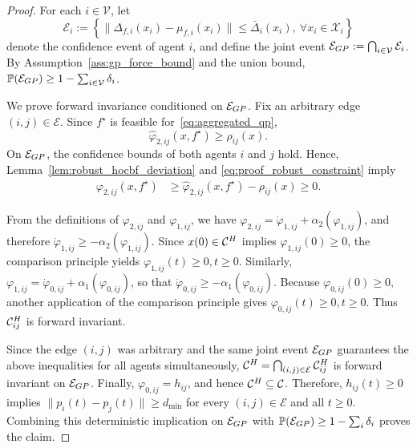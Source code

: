 \documentclass[10pt,a4paper]{amsart}
\begin{document}
\begin{proof}
For each $i\in\mathcal V$, let
\[
    \mathcal E_i
    :=
    \left\{
    \|\Delta_{f,i}(x_i)-\mu_{f,i}(x_i)\|
    \leq \bar\Delta_i(x_i),
    \ \forall x_i\in\mathcal X_i
    \right\}
\]
denote the confidence event of agent $i$, and define the joint
event $\mathcal E_{\rm GP}
    :=
    \bigcap_{i\in\mathcal V}\mathcal E_i$.
By Assumption~\ref{ass:gp_force_bound} and the union bound, $\mathbb P(\mathcal E_{\rm GP})
    \geq
    1-\sum_{i\in\mathcal V}\delta_i$.

We prove forward invariance conditioned on
$\mathcal E_{\rm GP}$. Fix an arbitrary edge
$(i,j)\in\mathcal E$. Since
$f^\star$ is feasible for~\eqref{eq:aggregated_qp},
\begin{equation}
    \widehat\varphi_{2,ij}(x,f^\star)
    \geq
    \rho_{ij}(x).
    \label{eq:proof_robust_constraint}
\end{equation}
On $\mathcal E_{\rm GP}$, the confidence bounds of both
agents $i$ and $j$ hold. Hence,
Lemma~\ref{lem:robust_hocbf_deviation} and
\eqref{eq:proof_robust_constraint} imply
\[
\begin{aligned}
    \varphi_{2,ij}(x,f^\star)
    &\geq
    \widehat\varphi_{2,ij}(x,f^\star)
    -
    \rho_{ij}(x)\geq0 .
\end{aligned}
\]

From the definitions of $\varphi_{2,ij}$ and $\varphi_{1,ij}$, we have 
$\varphi_{2,ij}
    =
    \dot\varphi_{1,ij}
    +
    \alpha_2(\varphi_{1,ij})$, and therefore
$\dot\varphi_{1,ij}
    \geq
    -\alpha_2(\varphi_{1,ij})$. Since $x(0)\in\mathcal C^{\rm H}$ implies
$\varphi_{1,ij}(0)\geq0$, the comparison principle yields $\varphi_{1,ij}(t)\geq0, t\geq0$. Similarly,
$\varphi_{1,ij}
    =
    \dot\varphi_{0,ij}
    +
    \alpha_1(\varphi_{0,ij})$, so that $\dot\varphi_{0,ij}
    \geq
    -\alpha_1(\varphi_{0,ij})$. Because $\varphi_{0,ij}(0)\geq0$, another application of the
comparison principle gives
$\varphi_{0,ij}(t)\geq0, t\geq0$. Thus $\mathcal C_{ij}^{\rm H}$ is forward invariant.

Since the edge $(i,j)$ was arbitrary and the same joint event
$\mathcal E_{\rm GP}$ guarantees the above inequalities for
all agents simultaneously,
$\mathcal C^{\rm H}
    =
    \bigcap_{(i,j)\in\mathcal E}
    \mathcal C_{ij}^{\rm H}$ is forward invariant on $\mathcal E_{\rm GP}$. Finally,
$\varphi_{0,ij}=h_{ij}$, and hence
$\mathcal C^{\rm H}\subseteq\mathcal C$. Therefore,
$h_{ij}(t)\geq0$ implies $\|p_i(t)-p_j(t)\|\geq d_{\min}$ for every $(i,j)\in\mathcal E$ and all $t\geq0$.
Combining this deterministic implication on
$\mathcal E_{\rm GP}$ with
$\mathbb P(\mathcal E_{\rm GP})
\geq1-\sum_i\delta_i$
proves the claim.
\end{proof}
\end{document}

